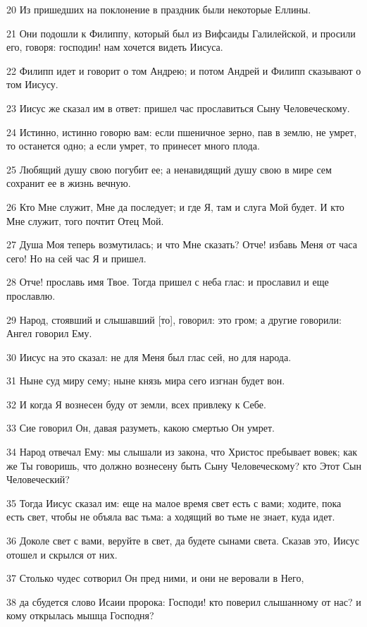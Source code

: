 \par 20 Из пришедших на поклонение в праздник были некоторые Еллины.
\par 21 Они подошли к Филиппу, который был из Вифсаиды Галилейской, и просили его, говоря: господин! нам хочется видеть Иисуса.
\par 22 Филипп идет и говорит о том Андрею; и потом Андрей и Филипп сказывают о том Иисусу.
\par 23 Иисус же сказал им в ответ: пришел час прославиться Сыну Человеческому.
\par 24 Истинно, истинно говорю вам: если пшеничное зерно, пав в землю, не умрет, то останется одно; а если умрет, то принесет много плода.
\par 25 Любящий душу свою погубит ее; а ненавидящий душу свою в мире сем сохранит ее в жизнь вечную.
\par 26 Кто Мне служит, Мне да последует; и где Я, там и слуга Мой будет. И кто Мне служит, того почтит Отец Мой.
\par 27 Душа Моя теперь возмутилась; и что Мне сказать? Отче! избавь Меня от часа сего! Но на сей час Я и пришел.
\par 28 Отче! прославь имя Твое. Тогда пришел с неба глас: и прославил и еще прославлю.
\par 29 Народ, стоявший и слышавший [то], говорил: это гром; а другие говорили: Ангел говорил Ему.
\par 30 Иисус на это сказал: не для Меня был глас сей, но для народа.
\par 31 Ныне суд миру сему; ныне князь мира сего изгнан будет вон.
\par 32 И когда Я вознесен буду от земли, всех привлеку к Себе.
\par 33 Сие говорил Он, давая разуметь, какою смертью Он умрет.
\par 34 Народ отвечал Ему: мы слышали из закона, что Христос пребывает вовек; как же Ты говоришь, что должно вознесену быть Сыну Человеческому? кто Этот Сын Человеческий?
\par 35 Тогда Иисус сказал им: еще на малое время свет есть с вами; ходите, пока есть свет, чтобы не объяла вас тьма: а ходящий во тьме не знает, куда идет.
\par 36 Доколе свет с вами, веруйте в свет, да будете сынами света. Сказав это, Иисус отошел и скрылся от них.
\par 37 Столько чудес сотворил Он пред ними, и они не веровали в Него,
\par 38 да сбудется слово Исаии пророка: Господи! кто поверил слышанному от нас? и кому открылась мышца Господня?
